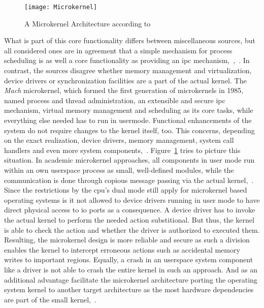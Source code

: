 \begin{figure} [t]
	\centering
	\texttt{[image: Microkernel]}
	\caption{A Microkernel Architecture according to~\cite{lfd430}}\label{pic:microkernel}
\end{figure}

What is part of this core functionality differs between miscellaneous sources, but all considered ones are in agreement that a simple mechanism for process scheduling is as well a core functionality as providing an \ac{ipc} mechanism\cite{lfd430},~\cite{silberschatz2009operating},~\cite{glatz2015betriebssysteme}.  
In contrast, the sources disagree whether memory management and virtualization, device drivers or synchronization facilities are a part of the actual kernel.
The \textit{Mach} microkernel, which formed the first generation of microkernels in 1985, named process and thread administration, an extensible and secure \ac{ipc} mechanism, virtual memory management and scheduling as its core tasks, while everything else needed has to run in usermode\cite{rashidMach}.
Functional enhancements of the system do not require changes to the kernel itself, too.
This concerns, depending on the exact realization, device drivers, memory management, system call handlers and even more system components\cite{lfd430},~\cite{silberschatz2009operating}.
Figure~\ref{pic:microkernel} tries to picture this situation.
In academic microkernel approaches, all components in user mode run within an own userspace process as small, well-defined modules, while the communication is done through copious message passing via the actual kernel\cite{tanenbaum-modern-operating-systems},~\cite{lfd430}.
Since the restrictions by the \ac{cpu}'s dual mode still apply for microkernel based operating systems is it not allowed to device drivers running in user mode to have direct physical access to \ac{io} ports as a consequence.
A device driver has to invoke the actual kernel to perform the needed action substitional.
But thus, the kernel is able to check the action and whether the driver is authorized to executed them.
Resulting, the microkernel design is more reliable and secure as such a division enables the kernel to intercept erroneous actions such as accidental memory writes to important regions\cite{tanenbaum-modern-operating-systems}.
Equally, a crash in an userspace system component like a driver is not able to crash the entire kernel in such an approach. 
And as an additional advantage facilitate the microkernel architecture porting the operating system kernel to another target architecture as the most hardware dependencies are part of the small kernel\cite{silberschatz2009operating},~\cite{lfd430}.

